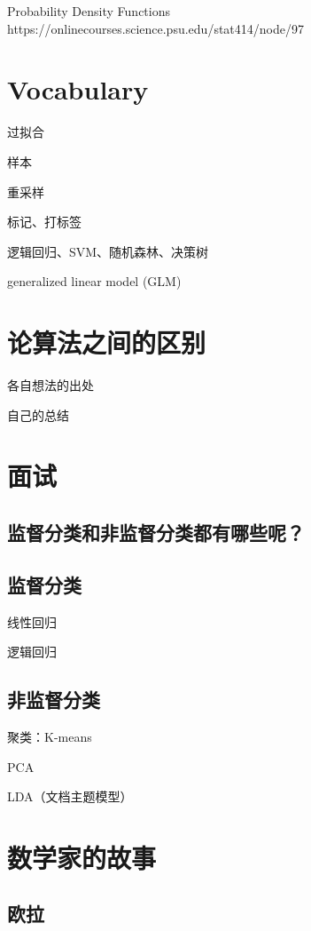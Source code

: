 \documentclass[UTF8]{ctexart}
\begin{document}
Probability Density Functions https://onlinecourses.science.psu.edu/stat414/node/97

\section{Vocabulary}

过拟合

样本

重采样

标记、打标签

逻辑回归、SVM、随机森林、决策树

generalized linear model (GLM)

\section{论算法之间的区别}

各自想法的出处

自己的总结

\section{面试}

\subsection{监督分类和非监督分类都有哪些呢？}

\subsection{监督分类}

线性回归

逻辑回归


\subsection{非监督分类}

聚类：K-means

PCA

LDA（文档主题模型）

\section{数学家的故事}

\subsection{欧拉}
\end{document}
